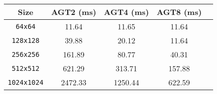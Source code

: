 {\small
\begin{tabular}{|c|c|c|c|c|}
    \hline Size & AGT2 (ms) & AGT4 (ms) & AGT8 (ms) \\
    \hline \verb|64x64| & 11.64 & 11.65 & 11.64 \\
    \verb|128x128| & 39.88 & 20.12 & 11.64 \\
    \verb|256x256| & 161.89 & 80.77 & 40.31 \\
    \verb|512x512| & 621.29 & 313.71 & 157.88 \\
    \verb|1024x1024| & 2472.33 & 1250.44 & 622.59 \\
    \hline
\end{tabular}}